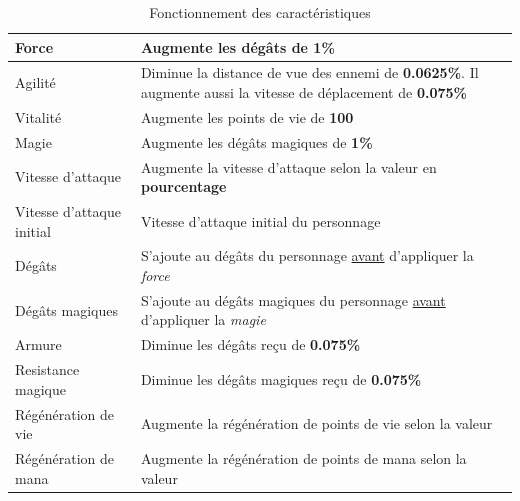 \documentclass[11pt, a4paper, oneside]{report}
\begin{document}
\begin{table}[ht]
\begin{center}
\begin{tabularx}{\textwidth}{| l | Y |}
  \hline                     
  Force 				& Augmente les dégâts de \textbf{1\%}\\ \hline
  Agilité 				& Diminue la distance de vue des ennemi de \textbf{0.0625\%}. Il augmente aussi la vitesse de déplacement de \textbf{0.075\%} \\ \hline
  Vitalité 				& Augmente les points de vie de \textbf{100} \\ \hline
  Magie 				& Augmente les dégâts magiques de \textbf{1\%} \\ \hline
  Vitesse d'attaque 	& Augmente la vitesse d'attaque selon la valeur en \textbf{pourcentage} \\ \hline
  Vitesse d'attaque initial	& Vitesse d'attaque initial du personnage\\ \hline
  Dégâts 				& S'ajoute au dégâts du personnage \underline{avant} d'appliquer la \emph{force} \\ \hline
  Dégâts magiques 		& S'ajoute au dégâts magiques du personnage \underline{avant} d'appliquer la \emph{magie} \\ \hline
  Armure 				& Diminue les dégâts reçu de \textbf{0.075\%} \\ \hline
  Resistance magique 	& Diminue les dégâts magiques reçu de \textbf{0.075\%} \\ \hline
  Régénération de vie 	& Augmente la régénération de points de vie selon la valeur\\ \hline
  Régénération de mana 	& Augmente la régénération de points de mana selon la valeur\\ \hline
\end{tabularx}
\caption{Fonctionnement des caractéristiques}
\end{center}
\end{table}
\end{document}
